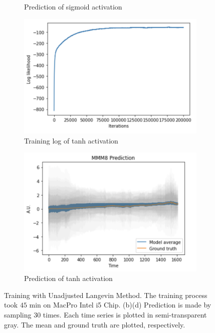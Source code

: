 \documentclass{article}
\begin{document}
\begin{figure}[h]
\begin{subfigure}[b]{0.5\textwidth}
        \caption{Prediction of sigmoid activation}
        \label{fig:prediction-sigmoid}
    \end{subfigure}
    \begin{subfigure}[b]{0.5\textwidth}
        \centering
        \includegraphics[width=\textwidth]{../img/training_Langevin_200000_tanh.png}
        \caption{Training log of tanh activation}
    \end{subfigure}\hfill
    \begin{subfigure}[b]{0.5\textwidth}
        \centering
        \includegraphics[trim={0 0 0 0.7cm}, clip, width=\textwidth]{../img/prediction_Langevin_200000_tanh.png}
        \caption{Prediction of tanh activation}
        \label{fig:prediction-tanh}
    \end{subfigure}
    \caption{Training with Unadjusted Langevin Method\citep{durmus2019high}. The training process took $45$ min on MacPro Intel i5 Chip. (b)(d) Prediction is made by sampling $30$ times. Each time series is plotted in semi-transparent gray. The mean and ground truth are plotted, respectively.}
\end{figure}
\end{document}
